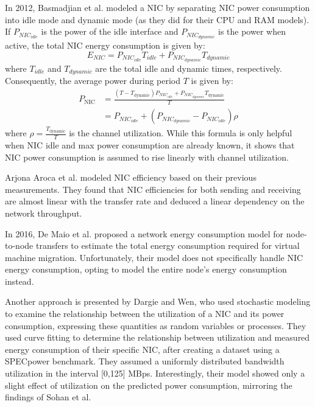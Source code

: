 In 2012, Basmadjian et al.\parencite{basmadjianCloudComputingIts2012} modeled a NIC by separating NIC power consumption into idle mode and dynamic mode (as they did for their CPU and RAM models). If $P_{NIC_{idle}}$ is the power of the idle interface and $P_{NIC_{dynamic}}$ is the power when active, the total NIC energy consumption is given by:
\begin{equation}
    E_{NIC} = P_{NIC_{idle}}T_{idle} + P_{NIC_{dynamic}}T_{dynamic}
\end{equation}
where $T_{idle}$ and $T_{dynamic}$ are the total idle and dynamic times, respectively. Consequently, the average power during period $T$ is given by:
\begin{align}
    P_{\text{NIC}} &= \frac{(T - T_{\text{dynamic}}) P_{NIC_{idle}} + P_{NIC_{dynamic}} T_{\text{dynamic}}}{T}\\
                   &= P_{NIC_{idle}} + (P_{NIC_{dynamic}} - P_{NIC_{idle}})\rho
\end{align}
where $\rho=\frac{T_{\text{dynamic}}}{T}$ is the channel utilization. While this formula is only helpful when NIC idle and max power consumption are already known, it shows that NIC power consumption is assumed to rise linearly with channel utilization.

Arjona Aroca et al.\parencite{arjonaarocaMeasurementbasedAnalysisEnergy2014} modeled NIC efficiency based on their previous measurements. They found that NIC efficiencies for both sending and receiving are almost linear with the transfer rate and deduced a linear dependency on the network throughput.

In 2016, De Maio et al.\parencite{demaioModellingEnergyConsumption2016} proposed a network energy consumption model for node-to-node transfers to estimate the total energy consumption required for virtual machine migration. Unfortunately, their model does not specifically handle NIC energy consumption, opting to model the entire node's energy consumption instead.

Another approach is presented by Dargie and Wen\parencite{dargieProbabilisticModelEstimating2013}, who used stochastic modeling to examine the relationship between the utilization of a NIC and its power consumption, expressing these quantities as random variables or processes. They used curve fitting to determine the relationship between utilization and measured energy consumption of their specific NIC, after creating a dataset using a SPECpower benchmark. They assumed a uniformly distributed bandwidth utilization in the interval [0,125] MBps. Interestingly, their model showed only a slight effect of utilization on the predicted power consumption, mirroring the findings of Sohan et al.

